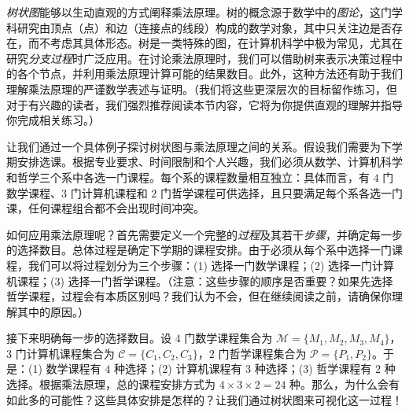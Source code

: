 \emph{树状图}能够以生动直观的方式阐释乘法原理。树的概念源于数学中的\emph{图论}，这门学科研究由顶点（点）和边（连接点的线段）构成的数学对象，其中只关注边是否存在，而不考虑其具体形态。树是一类特殊的图，在计算机科学中极为常见，尤其在研究\emph{分支过程}时广泛应用。在讨论乘法原理时，我们可以借助树来表示决策过程中的各个节点，并利用乘法原理计算可能的结果数目。此外，这种方法还有助于我们理解乘法原理的严谨数学表述与证明。（我们将这些更深层次的目标留作练习，但对于有兴趣的读者，我们强烈推荐阅读本节内容，它将为你提供直观的理解并指导你完成相关练习。）

\begin{example}
    让我们通过一个具体例子探讨树状图与乘法原理之间的关系。假设我们需要为下学期安排选课。根据专业要求、时间限制和个人兴趣，我们必须从数学、计算机科学和哲学三个系中各选一门课程。每个系的课程数量相互独立：具体而言，有 $4$ 门数学课程、$3$ 门计算机课程和 $2$ 门哲学课程可供选择，且只要满足每个系各选一门课，任何课程组合都不会出现时间冲突。

    如何应用乘法原理呢？首先需要定义一个完整的\emph{过程}及其若干\emph{步骤}，并确定每一步的选择数目。总体过程是确定下学期的课程安排。由于必须从每个系中选择一门课程，我们可以将过程划分为三个步骤：(1) 选择一门数学课程；(2) 选择一门计算机课程；(3) 选择一门哲学课程。（注意：这些步骤的顺序是否重要？如果先选择哲学课程，过程会有本质区别吗？我们认为不会，但在继续阅读之前，请确保你理解其中的原因。）

    接下来明确每一步的选择数目。设 $4$ 门数学课程集合为 $\mathcal{M} = \{M_1, M_2, M_3, M_4\}$，$3$ 门计算机课程集合为 $\mathcal{C} = \{C_1, C_2, C_3\}$，$2$ 门哲学课程集合为 $\mathcal{P} = \{P_1, P_2\}$。于是：(1) 数学课程有 $4$ 种选择；(2) 计算机课程有 $3$ 种选择；(3) 哲学课程有 $2$ 种选择。根据乘法原理，总的课程安排方式为 $4 \times 3 \times 2 = 24$ 种。那么，为什么会有如此多的可能性？这些具体安排是怎样的？让我们通过树状图来可视化这一过程！


\end{example}
